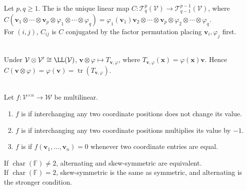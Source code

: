 \begin{definition} \label{def:contraction-map} \\
Let $p,q\geq1$. The  is the unique linear map $C:\mathcal{T}^{p}_{q}(\mathcal{V})\to\mathcal{T}^{p-1}_{q-1}(\mathcal{V})$, where\\
$C(\mathbf{v}_1\otimes\cdots\otimes\mathbf{v}_p\otimes\varphi_1\otimes\cdots\otimes\varphi_q)=\varphi_1(\mathbf{v}_1)\mathbf{v}_2\otimes\cdots\otimes\mathbf{v}_p\otimes\varphi_2\otimes\cdots\otimes\varphi_q$.\\
For $(i,j)$, $C_{ij}$ is $C$ conjugated by the factor permutation placing $\mathbf{v}_i,\varphi_j$ first.
\end{definition}

\begin{example} \label{ex:rank-one-operator-contraction-trace} \\
Under $\mathcal{V}\otimes\mathcal{V}'\cong\LL(\mathcal{V})$, $\mathbf{v}\otimes\varphi\mapsto T_{\mathbf{v},\varphi}$, where $T_{\mathbf{v},\varphi}(\mathbf{x})=\varphi(\mathbf{x})\mathbf{v}$. Hence $C(\mathbf{v}\otimes\varphi)=\varphi(\mathbf{v})=\operatorname{tr}(T_{\mathbf{v},\varphi})$.
\end{example}

\begin{definition} \label{def:special-multilinear-maps} \\
Let $f:\mathcal{V}^{\times n}\to\mathcal{W}$ be multilinear.
\begin{enumerate}[label=(\roman*)]
\setlength{\itemsep}{0pt}
\item $f$ is  if interchanging any two coordinate positions does not change its value.
\item $f$ is  if interchanging any two coordinate positions multiplies its value by $-1$.
\item $f$ is  if $f(\mathbf{v}_1,\ldots,\mathbf{v}_n)=0$ whenever two coordinate entries are equal.
\end{enumerate}
If $\operatorname{char}(\mathbb{F})\neq2$, alternating and skew-symmetric are equivalent.\\
If $\operatorname{char}(\mathbb{F})=2$, skew-symmetric is the same as symmetric, and alternating is the stronger condition.
\end{definition}


